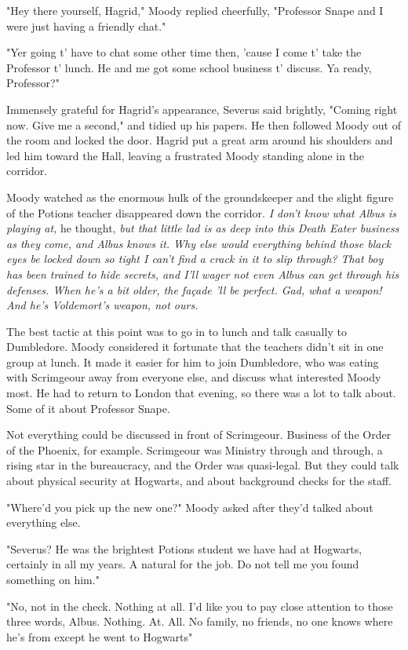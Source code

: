 "Hey there yourself, Hagrid," Moody replied cheerfully, "Professor Snape and I were just having a friendly chat."

"Yer going t' have to chat some other time then, 'cause I come t' take the Professor t' lunch. He and me got some school business t' discuss. Ya ready, Professor?"

Immensely grateful for Hagrid's appearance, Severus said brightly, "Coming right now. Give me a second," and tidied up his papers. He then followed Moody out of the room and locked the door. Hagrid put a great arm around his shoulders and led him toward the Hall, leaving a frustrated Moody standing alone in the corridor.

Moody watched as the enormous hulk of the groundskeeper and the slight figure of the Potions teacher disappeared down the corridor. \emph{I don't know what Albus is playing at,} he thought, \emph{but that little lad is as deep into this Death Eater business as they come, and Albus knows it. Why else would everything behind those black eyes be locked down so tight I can't find a crack in it to slip through? That boy has been trained to hide secrets, and I'll wager not even Albus can get through his defenses. When he's a bit older, the façade 'll be perfect. Gad, what a weapon! And he's Voldemort's weapon, not ours.}

The best tactic at this point was to go in to lunch and talk casually to Dumbledore. Moody considered it fortunate that the teachers didn't sit in one group at lunch. It made it easier for him to join Dumbledore, who was eating with Scrimgeour away from everyone else, and discuss what interested Moody most. He had to return to London that evening, so there was a lot to talk about. Some of it about Professor Snape.

Not everything could be discussed in front of Scrimgeour. Business of the Order of the Phoenix, for example. Scrimgeour was Ministry through and through, a rising star in the bureaucracy, and the Order was quasi-legal. But they could talk about physical security at Hogwarts, and about background checks for the staff.

"Where'd you pick up the new one?" Moody asked after they'd talked about everything else.

"Severus? He was the brightest Potions student we have had at Hogwarts, certainly in all my years. A natural for the job. Do not tell me you found something on him."

"No, not in the check. Nothing at all. I'd like you to pay close attention to those three words, Albus. Nothing. At. All. No family, no friends, no one knows where he's from except he went to Hogwarts{\el}"

